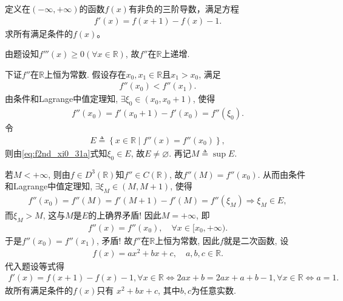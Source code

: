 \documentclass[../../main.tex]{subfiles}%
\begin{document}
\begin{example}
定义在$(-\infty,+\infty)$的函数$f(x)$有非负的三阶导数，满足方程
\begin{align*}
f'(x) = f(x+1) - f(x) - 1.
\end{align*}
求所有满足条件的$f(x)$。
\end{example}
\begin{solution}
由题设知$f'''(x) \geqslant 0\left( \forall x\in \mathbb{R} \right)$, 故$f''$在$\mathbb{R}$上递增.

下证$f''$在$\mathbb{R}$上恒为常数. 假设存在$x_0,x_1\in \mathbb{R}$且$x_1>x_0$, 满足
\begin{align*}
f''(x_0) < f''(x_1).
\end{align*}
由条件和Lagrange中值定理知, $\exists \xi_0\in (x_0,x_0+1)$, 使得
\begin{align}
f''(x_0) = f'(x_0+1) - f'(x_0) = f''(\xi_0).
\label{eq:f2nd_xi0_31a}
\end{align}
令
\begin{align*}
E \triangleq \left\{ x\in \mathbb{R} \mid f''(x) = f''(x_0) \right\},
\end{align*}
则由\eqref{eq:f2nd_xi0_31a}式知$\xi_0\in E$, 故$E\ne \varnothing$. 再记$M \triangleq \sup E$.

若$M<+\infty$, 则由$f\in D^3(\mathbb{R})$知$f''\in C(\mathbb{R})$, 故$f''(M) = f''(x_0)$. 从而由条件和Lagrange中值定理知, $\exists \xi_M\in (M,M+1)$, 使得
\begin{align*}
f''(x_0) = f''(M) = f'(M+1) - f'(M) = f''(\xi_M) \Longrightarrow \xi_M\in E,
\end{align*}
而$\xi_M>M$, 这与$M$是$E$的上确界矛盾! 因此$M=+\infty$, 即
\begin{align*}
f''(x) = f''(x_0), \quad \forall x\in [x_0,+\infty).
\end{align*}
于是$f''(x_0) = f''(x_1)$, 矛盾! 故$f''$在$\mathbb{R}$上恒为常数, 因此$f$就是二次函数, 设
\begin{align*}
f(x) = ax^2+bx+c, \quad a,b,c\in \mathbb{R}.
\end{align*}
代入题设等式得
\begin{align*}
f'(x) = f(x+1) - f(x) - 1,\forall x\in \mathbb{R} \Longleftrightarrow 2ax+b=2ax+a+b-1,\forall x\in \mathbb{R} \Longleftrightarrow a=1.
\end{align*}
故所有满足条件的$f(x)$只有
$x^2+bx+c$, 其中$b,c$为任意实数.
\end{solution}
\end{document}
